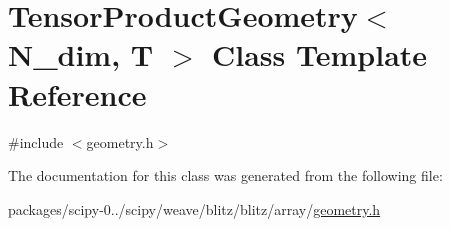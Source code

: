 \hypertarget{classTensorProductGeometry}{}\section{Tensor\+Product\+Geometry$<$ N\+\_\+dim, T $>$ Class Template Reference}
\label{classTensorProductGeometry}


{\ttfamily \#include $<$geometry.\+h$>$}



The documentation for this class was generated from the following file\+:\begin{DoxyCompactItemize}
\item 
packages/scipy-\/0../scipy/weave/blitz/blitz/array/\hyperlink{geometry_8h}{geometry.\+h}\end{DoxyCompactItemize}
